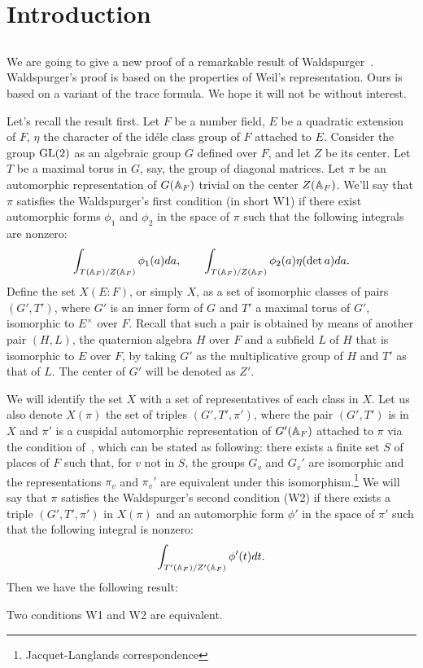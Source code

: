 

\section{Introduction}
\subsection{}

We are going to give a new proof of a remarkable result of Waldspurger~\cite{waldspurger1985valeurs}.
Waldspurger's proof is based on the properties of Weil's representation.
Ours is based on a variant of the trace formula.
We hope it will not be without interest.

Let's recall the result first.
Let $F$ be a number field, $E$ be a quadratic extension of $F$, $\eta$ the character of the id\'ele class group of $F$ attached to $E$.
Consider the group $\mathrm{GL}(2)$ as an algebraic group $G$ defined over $F$, and let $Z$ be its center.
Let $T$ be a maximal torus in $G$, say,  the group of diagonal matrices.
Let $\pi$ be an automorphic representation of $G(\mathbb{A}_F)$ trivial on the center $Z(\mathbb{A}_F)$.
We'll say that $\pi$ satisfies the Waldspurger's first condition (in short W1) if there exist automorphic forms $\phi_1$ and $\phi_2$ in the space of $\pi$ such that the following integrals are nonzero:
\begin{equation}
    \int_{T(\mathbb{A}_F) / Z(\mathbb{A}_F)} \phi_1(a) da, \qquad \int_{T(\mathbb{A}_F) / Z(\mathbb{A}_F)} \phi_2(a) \eta(\det a) da.
\end{equation}
Define the set $X(E:F)$, or simply $X$, as a set of isomorphic classes of pairs $(G', T')$, where $G'$ is an inner form of $G$ and $T'$ a maximal torus of $G'$, isomorphic to $E^\times$ over $F$.
Recall that such a pair is obtained by means of another pair $(H, L)$, the quaternion algebra $H$ over $F$ and a subfield $L$ of $H$ that is isomorphic to $E$ over $F$, by taking $G'$ as the multiplicative group of $H$ and $T'$ as that of $L$.
The center of $G'$ will be denoted as $Z'$.

We will identify the set $X$ with a set of representatives of each class in $X$.
Let us also denote $X(\pi)$ the set of triples $(G', T', \pi')$, where the pair $(G', T')$ is in $X$ and $\pi'$ is a cuspidal automorphic representation of $G'(\mathbb{A}_F)$ attached to $\pi$ via the condition of~\cite{jacquet2006automorphic}, which can be stated as following: there exists a finite set $S$ of places of $F$ such that, for $v$ not in $S$, the groups $G_v$ and $G_v'$ are isomorphic and the representations $\pi_v$ and $\pi_v'$ are equivalent under this isomorphism.\footnote{Jacquet-Langlands correspondence}
We will say that $\pi$ satisfies the Waldspurger's second condition (W2) if there exists a triple $(G', T', \pi')$ in $X(\pi)$ and an automorphic form $\phi'$ in the space of $\pi'$ such that the following integral is nonzero:
\begin{equation}
    \int_{T'(\mathbb{A}_F) / Z'(\mathbb{A}_F)} \phi'(t) dt.
\end{equation}
Then we have the following result:
\begin{theorem}[Waldspurger]
Two conditions W1 and W2 are equivalent. 
\end{theorem}

